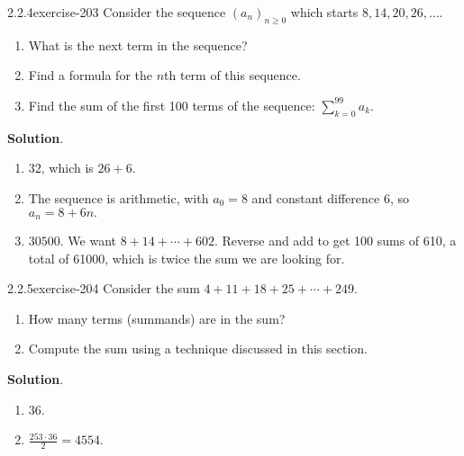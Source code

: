 \documentclass[twoside,11pt,]{book}
\numberwithin{equation}{chapter}
\begin{document}
\begin{divisionsolution}{2.2.4}{}{exercise-203}%
\hypertarget{p-3192}{}%
Consider the sequence \((a_n)_{n \ge 0}\) which starts \(8, 14, 20, 26, \ldots\text{.}\)\leavevmode%
\begin{enumerate}[label=(\alph*)]
\item\hypertarget{li-1876}{}\hypertarget{p-3193}{}%
What is the next term in the sequence?%
\item\hypertarget{li-1877}{}\hypertarget{p-3195}{}%
Find a formula for the \(n\)th term of this sequence.%
\item\hypertarget{li-1878}{}\hypertarget{p-3196}{}%
Find the sum of the first 100 terms of the sequence: \(\sum_{k=0}^{99}a_k\text{.}\)%
\end{enumerate}
%
\par\smallskip%
\noindent\textbf{Solution}.\quad%
\hypertarget{p-3198}{}%
\leavevmode%
\begin{enumerate}[label=(\alph*)]
\item\hypertarget{li-1879}{}\hypertarget{p-3199}{}%
\(32\text{,}\) which is \(26+6\text{.}\)%
\item\hypertarget{li-1880}{}\hypertarget{p-3200}{}%
The sequence is arithmetic, with \(a_0 = 8\) and constant difference 6, so \(a_n = 8 + 6n\text{.}\)%
\item\hypertarget{li-1881}{}\hypertarget{p-3201}{}%
\(30500\text{.}\) We want \(8 + 14 + \cdots + 602\text{.}\) Reverse and add to get 100 sums of 610, a total of 61000, which is twice the sum we are looking for.%
\end{enumerate}
%
\end{divisionsolution}%
\begin{divisionsolution}{2.2.5}{}{exercise-204}%
\hypertarget{p-3209}{}%
Consider the sum \(4 + 11 + 18 + 25 + \cdots + 249\text{.}\)\leavevmode%
\begin{enumerate}[label=(\alph*)]
\item\hypertarget{li-1886}{}\hypertarget{p-3210}{}%
How many terms (summands) are in the sum?%
\item\hypertarget{li-1887}{}\hypertarget{p-3212}{}%
Compute the sum using a technique discussed in this section.%
\end{enumerate}
%
\par\smallskip%
\noindent\textbf{Solution}.\quad%
\hypertarget{p-3214}{}%
\leavevmode%
\begin{enumerate}[label=(\alph*)]
\item\hypertarget{li-1888}{}\hypertarget{p-3215}{}%
36.%
\item\hypertarget{li-1889}{}\hypertarget{p-3216}{}%
\(\frac{253 \cdot 36}{2} = 4554\text{.}\)%
\end{enumerate}
%
\end{divisionsolution}%
\end{document}
